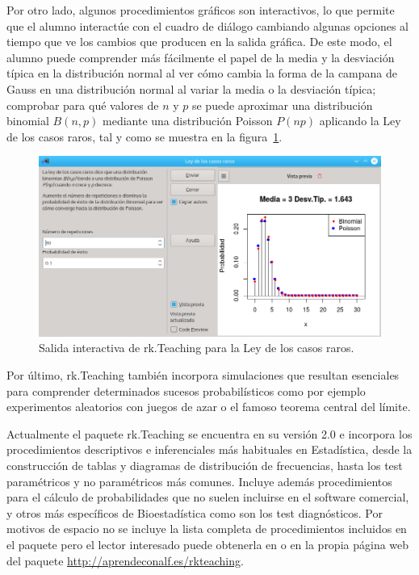 \documentclass[a4paper,10pt,twoside]{article}
\newcommand{\rkteaching}{\textsf{rk.Teaching}}
\begin{document}
\begin{description}
Por otro lado, algunos procedimientos gráficos son interactivos, lo que permite que el alumno interactúe con el cuadro
de diálogo cambiando algunas opciones al tiempo que ve los cambios que producen en la salida gráfica.
De este modo, el alumno puede comprender más fácilmente el papel de la media y la desviación típica en la distribución
normal al ver cómo cambia la forma de la campana de Gauss en una distribución normal al variar la media o la desviación
típica; comprobar para qué valores de $n$ y $p$ se puede aproximar una distribución binomial $B(n,p)$ mediante una
distribución Poisson $P(np)$ aplicando la Ley de los casos raros, tal y como se muestra en la
figura~\ref{f:ley-casos-raros}.

\begin{figure}[htp]
\begin{center}
\includegraphics[width=\textwidth]{img/ley_casos_raros.png}
\caption{Salida interactiva de \rkteaching{} para la Ley de los casos raros.}
\label{f:ley-casos-raros}
\end{center}
\end{figure}

Por último, \rkteaching{} también incorpora simulaciones que resultan esenciales para comprender determinados sucesos
probabilísticos como por ejemplo experimentos aleatorios con juegos de azar o el famoso teorema central del límite.  
\end{description}

Actualmente el paquete \rkteaching{} se encuentra en su versión 2.0 e incorpora los procedimientos descriptivos e
inferenciales más habituales en Estadística, desde la construcción de tablas y diagramas de distribución
de frecuencias, hasta los test paramétricos y no paramétricos más comunes. 
Incluye además procedimientos para el cálculo de probabilidades que no suelen incluirse en el software comercial, y
otros más específicos de Bioestadística como son los test diagnósticos. 
Por motivos de espacio no se incluye la lista completa de procedimientos incluidos en el paquete pero el lector
interesado puede obtenerla en \cite{asalber2016bringing} o en la propia página web del paquete
\url{http://aprendeconalf.es/rkteaching}.
\end{document}
